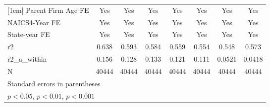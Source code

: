 {\begin{tabular}{l*{7}{c}}
[1em]
Parent Firm Age FE&         Yes         &         Yes         &         Yes         &         Yes         &         Yes         &         Yes         &         Yes         \\
[1em]
NAICS4-Year FE&         Yes         &         Yes         &         Yes         &         Yes         &         Yes         &         Yes         &         Yes         \\
[1em]
State-year FE&         Yes         &         Yes         &         Yes         &         Yes         &         Yes         &         Yes         &         Yes         \\
\hline
r2          &       0.638         &       0.593         &       0.584         &       0.559         &       0.554         &       0.548         &       0.573         \\
r2\_a\_within &       0.156         &       0.128         &       0.133         &       0.121         &       0.111         &      0.0521         &      0.0418         \\
N           &       40444         &       40444         &       40444         &       40444         &       40444         &       40444         &       40444         \\
\hline\hline
\multicolumn{8}{l}{\footnotesize Standard errors in parentheses}\\
\multicolumn{8}{l}{\footnotesize \sym{*} \(p<0.05\), \sym{**} \(p<0.01\), \sym{***} \(p<0.001\)}\\
\end{tabular}
}
